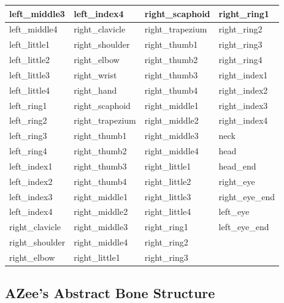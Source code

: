 \documentclass[../main.tex]{subfiles}
\begin{document}
\begin{longtable}{|l|l|l|l|}
    left\_middle3 & left\_index4 & right\_scaphoid & right\_ring1 \\ \hline
    left\_middle4 & right\_clavicle & right\_trapezium & right\_ring2 \\ \hline
    left\_little1 & right\_shoulder & right\_thumb1 & right\_ring3 \\ \hline
    left\_little2 & right\_elbow & right\_thumb2 & right\_ring4 \\ \hline
    left\_little3 & right\_wrist & right\_thumb3 & right\_index1 \\ \hline
    left\_little4 & right\_hand & right\_thumb4 & right\_index2 \\ \hline
    left\_ring1 & right\_scaphoid & right\_middle1 & right\_index3 \\ \hline
    left\_ring2 & right\_trapezium & right\_middle2 & right\_index4 \\ \hline
    left\_ring3 & right\_thumb1 & right\_middle3 & neck \\ \hline
    left\_ring4 & right\_thumb2 & right\_middle4 & head \\ \hline
    left\_index1 & right\_thumb3 & right\_little1 & head\_end \\ \hline
    left\_index2 & right\_thumb4 & right\_little2 & right\_eye \\ \hline
    left\_index3 & right\_middle1 & right\_little3 & right\_eye\_end \\ \hline
    left\_index4 & right\_middle2 & right\_little4 & left\_eye \\ \hline
    right\_clavicle & right\_middle3 & right\_ring1 & left\_eye\_end \\ \hline
    right\_shoulder & right\_middle4 & right\_ring2 &  \\ \hline
    right\_elbow & right\_little1 & right\_ring3 &  \\ \hline
\end{longtable}

\subsection{AZee's Abstract Bone Structure}
\label{annex:background_work:azee_abstract_bones}
\end{document}
